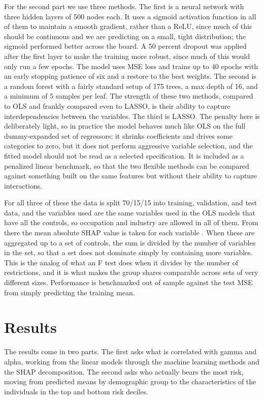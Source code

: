 \documentclass[12pt]{article}
\begin{document}
\begin{onehalfspace}
For the second part we use three methods. The first is a neural network with three hidden layers of 500 nodes each. It uses a sigmoid activation function in all of them to maintain a smooth gradient, rather than a ReLU, since much of this should be continuous and we are predicting on a small, tight distribution; the sigmoid performed better across the board. A 50 percent dropout was applied after the first layer to make the training more robust, since much of this would only run a few epochs. The model uses MSE loss and trains up to 40 epochs with an early stopping patience of six and a restore to the best weights. The second is a random forest with a fairly standard setup of 175 trees, a max depth of 16, and a minimum of 5 samples per leaf. The strength of these two methods, compared to OLS and frankly compared even to LASSO, is their ability to capture interdependencies between the variables. The third is LASSO. The penalty here is deliberately light, so in practice the model behaves much like OLS on the full dummy-expanded set of regressors: it shrinks coefficients and drives some categories to zero, but it does not perform aggressive variable selection, and the fitted model should not be read as a selected specification. It is included as a penalized linear benchmark, so that the two flexible methods can be compared against something built on the same features but without their ability to capture interactions.

For all three of these the data is split 70/15/15 into training, validation, and test data, and the variables used are the same variables used in the OLS models that have all the controls, so occupation and industry are allowed in all of them. From there the mean absolute SHAP value is taken for each variable \cite{lundberq}. When these are aggregated up to a set of controls, the sum is divided by the number of variables in the set, so that a set does not dominate simply by containing more variables. This is the analog of what an F test does when it divides by the number of restrictions, and it is what makes the group shares comparable across sets of very different sizes. Performance is benchmarked out of sample against the test MSE from simply predicting the training mean.


\section{Results}

The results come in two parts. The first asks what is correlated with gamma and alpha, working from the linear models through the machine learning methods and the SHAP decomposition. The second asks who actually bears the most risk, moving from predicted means by demographic group to the characteristics of the individuals in the top and bottom risk deciles.


\end{onehalfspace}
\end{document}
